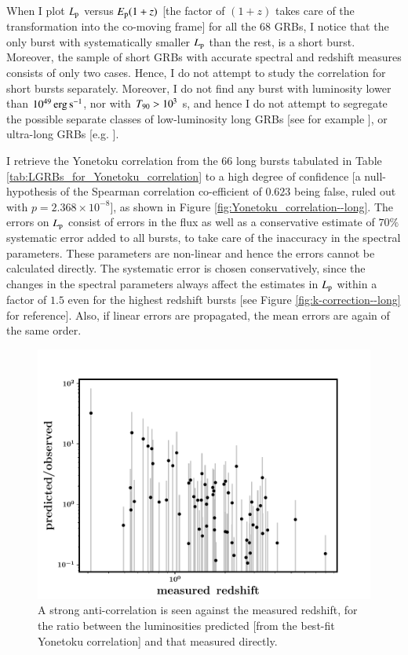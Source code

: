 When I plot $L_{\rm p}$ versus $E_{\rm p} (1+z)$ [the factor of $(1+z)$ takes care of the transformation into the co-moving frame] for all the 68 GRBs, I notice that the only burst with systematically smaller $L_{\rm p}$ than the rest, is a short burst. Moreover, the sample of short GRBs with accurate spectral and redshift measures consists of only two cases. Hence, I do not attempt to study the correlation for short bursts separately. Moreover, I do not find any burst with luminosity lower than $10^{49} \, \rm erg \, s^{-1} $, nor with $T_{\rm{90}} > 10^3$ s, and hence I do not attempt to segregate the possible separate classes of low-luminosity long GRBs [see for example \cite{Liang_et_al.-2007-ApJ}], or ultra-long GRBs [e.g. \cite{Levan_et_al.-2014-ApJ}].

I retrieve the Yonetoku correlation from the $66$ long bursts tabulated in Table \ref{tab:LGRBs_for_Yonetoku_correlation} to a high degree of confidence [a null-hypothesis of the Spearman correlation co-efficient of $0.623$ being false, ruled out with $p = 2.368 \times 10^{-8}$], as shown in Figure \ref{fig:Yonetoku_correlation--long}. The errors on $L_{\rm p}$ consist of errors in the flux as well as a conservative estimate of $70 \%$ systematic error added to all bursts, to take care of the inaccuracy in the spectral parameters. These parameters are non-linear and hence the errors cannot be calculated directly. The systematic error is chosen conservatively, since the changes in the spectral parameters always affect the estimates in $L_{\rm p}$ within a factor of $1.5$ even for the highest redshift bursts [see Figure \ref{fig:k-correction--long} for reference]. Also, if linear errors are propagated, the mean errors are again of the same order.

\begin{figure}
\begin{center}
\includegraphics[scale=0.5]{scatter_with_measured_redshift--my_bestfit}
\caption[Systematic trend in the ratio of observed and predicted luminosities]{A strong anti-correlation is seen against the measured redshift, for the ratio between the luminosities predicted [from the best-fit Yonetoku correlation] and that measured directly.}
\label{fig:correlation_of_ratio_with_measured_z}
\end{center}
\end{figure}


